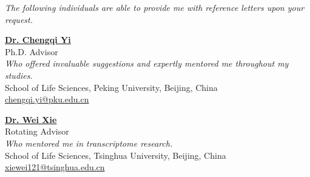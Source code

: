 \textit{The following individuals are able to provide me with reference letters upon your request.}

\vspace{4pt}

\textbf{\href{https://www.bio.pku.edu.cn/enhomes/news/teacher_dis/91.html}{Dr. Chengqi Yi}}\\
Ph.D. Advisor \\
\textit{Who offered invaluable suggestions and expertly mentored me throughout my studies.}\\
School of Life Sciences, Peking University, Beijing, China\\
\href{mailto:chengqi.yi@pku.edu.cn}{chengqi.yi@pku.edu.cn}\\





\vspace{4pt}

\textbf{\href{https://life.tsinghua.edu.cn/lifeen/info/1034/1077.htm}{Dr. Wei Xie}}\\
Rotating Advisor\\
\textit{Who mentored me in transcriptome research.}\\
School of Life Sciences, Tsinghua University, Beijing, China\\
\href{mailto:xiewei121@tsinghua.edu.cn}{xiewei121@tsinghua.edu.cn}\\


